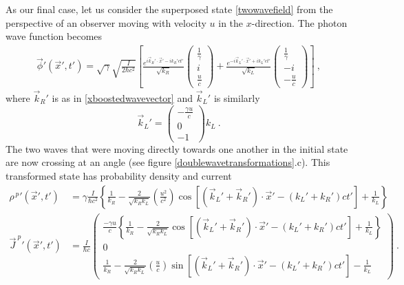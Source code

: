 \documentclass[12pt,secnumarabic,amsmath,amssymb,balancelastpage,nofootinbib]{article}
\begin{document}
As our final case, let us consider the superposed state \eqref{twowavefield} from the perspective of an observer moving with velocity $u$ in the $x$-direction.  The photon wave function becomes
\begin{align}
\vec{\phi}'(\vec{x}', t') = 
\sqrt{\gamma}
\sqrt{\frac{I}{2 \hbar c^2}}\left[
\frac{e^{i \vec{k}_R' \cdot \vec{x}'-i k_R' c t'}}{\sqrt{k_R}}
\begin{pmatrix}
\frac{1}{\gamma} \\
i \\
\frac{u}{c}
\end{pmatrix}
+
\frac{e^{-i \vec{k}_L' \cdot \vec{x}'+i k_L' c t'}}{\sqrt{k_L}}
\begin{pmatrix}
\frac{1}{\gamma} \\
-i \\
-\frac{u}{c}
\end{pmatrix}
\right]
\ ,
\end{align}
where $\vec{k}_R'$ is as in \eqref{xboostedwavevector} and $\vec{k}_L'$ is similarly
\begin{equation}
\vec{k}_L'=\begin{pmatrix}
- \frac{\gamma u}{c} \\
0 \\
-1
\end{pmatrix} k_L
\ .
\end{equation}
The two waves that were moving directly towards one another in the initial state are now crossing at an angle (see figure \ref{doublewavetransformations}.c).  This transformed state has probability density and current
\begin{align}
\rho^{\,p}{}'(\vec{x}',t') &=\gamma\frac{I}{\hbar c^2}\left\{ \frac{1}{k_R} - \frac{2}{\sqrt{k_R k_L}}\left(\frac{u^2}{c^2}\right)\cos\left[( \vec{k}_L' +\vec{k}_R' )\cdot \vec{x}'- ( k_L' + k_R' ) c t' \right]+\frac{1}{k_L} \right\}
\nonumber
\\
\vec{J}^{\:p}{}'(\vec{x}',t') &=\frac{I}{\hbar c}
\begin{pmatrix}
 \frac{-\gamma u}{c} \left\{\frac{1}{k_R}  - \frac{2}{\sqrt{k_R k_L}} \cos\left[( \vec{k}_L' +\vec{k}_R' )\cdot \vec{x}'- ( k_L' + k_R' ) c t' \right] + \frac{1}{k_L}\right\}\\
0 \\
\frac{1}{k_R}  - \frac{2}{\sqrt{k_R k_L}}
\left( \frac{u}{c} \right) \sin\left[( \vec{k}_L' +\vec{k}_R' )\cdot \vec{x}'- ( k_L' + k_R' ) c t' \right]- \frac{1}{k_L}
\end{pmatrix}
\ .
\label{probflowsuperpositionxboosted}
\end{align}
\end{document}
